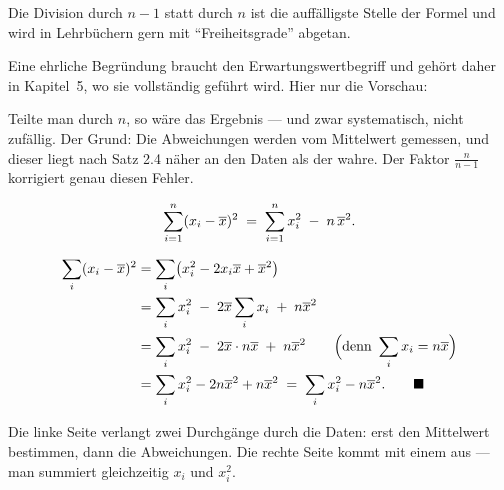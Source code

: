\begin{warnung}
Die Division durch $n-1$ statt durch $n$ ist die auffälligste Stelle der Formel und wird in Lehrbüchern gern mit \enquote{Freiheitsgrade} abgetan.

Eine ehrliche Begründung braucht den Erwartungswertbegriff und gehört daher in Kapitel~5, wo sie vollständig geführt wird. Hier nur die Vorschau:

\begin{center}
\begin{minipage}{0.9\textwidth}
Teilte man durch $n$, so wäre das Ergebnis  --- und zwar systematisch, nicht zufällig. Der Grund: Die Abweichungen werden vom  Mittelwert gemessen, und dieser liegt nach Satz 2.4 näher an den Daten als der wahre. Der Faktor $\frac{n}{n-1}$ korrigiert genau diesen Fehler.
\end{minipage}
\end{center}

\begin{center}
\begin{minipage}{0.88\textwidth}
\end{minipage}
\end{center}
\end{warnung}

\begin{merksatz}
\[ \sum_{i=1}^n (x_i - \overline{x})^2 \;=\; \sum_{i=1}^n x_i^2 \;-\; n\,\overline{x}^2 . \]

\begin{align*}
\sum_i (x_i - \overline{x})^2 &= \sum_i \bigl(x_i^2 - 2x_i\overline{x} + \overline{x}^2\bigr)\\
&= \sum_i x_i^2 \;-\; 2\overline{x}\sum_i x_i \;+\; n\overline{x}^2\\
&= \sum_i x_i^2 \;-\; 2\overline{x} \cdot n\overline{x} \;+\; n\overline{x}^2 \qquad \Bigl(\text{denn } \sum_i x_i = n\overline{x}\Bigr)\\
&= \sum_i x_i^2 - 2n\overline{x}^2 + n\overline{x}^2 \;=\; \sum_i x_i^2 - n\overline{x}^2 . \qquad \blacksquare
\end{align*}

Die linke Seite verlangt zwei Durchgänge durch die Daten: erst den Mittelwert bestimmen, dann die Abweichungen. Die rechte Seite kommt mit einem aus --- man summiert gleichzeitig $x_i$ und $x_i^2$.

\begin{center}
\begin{minipage}{0.88\textwidth}
\end{minipage}
\end{center}
\end{merksatz}

